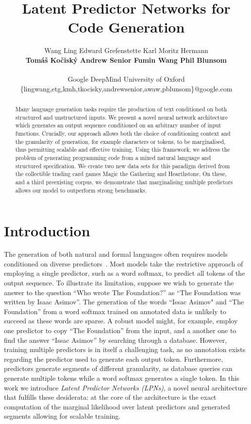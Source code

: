 \documentclass[11pt]{article}
\title{Latent Predictor Networks for Code Generation}
\author{
Wang Ling Edward Grefenstette Karl Moritz Hermann
\\
{\bf Tom\'a\v{s} Ko\v{c}isk\'y Andrew Senior Fumin Wang Phil Blunsom}
\\
\\
Google DeepMind University of Oxford
\\
\{lingwang,etg,kmh,tkocisky,andrewsenior,awaw,pblunsom\}@google.com
}\date{}
\begin{document}
\maketitle

\begin{abstract}
Many language generation tasks require the production of text
conditioned on both structured and unstructured inputs. We
present a novel neural network architecture which generates an output sequence
conditioned on an arbitrary number of input functions. Crucially, our approach
allows both the choice of conditioning context and the granularity of
generation, for example characters or tokens, to be marginalised, thus
permitting scalable and effective training.  Using this framework, we address
the problem of generating programming code from a mixed natural language and
structured specification. We create two new data sets for this paradigm derived
from the collectible trading card games Magic the Gathering and Hearthstone. On
these, and a third preexisting corpus, we demonstrate that marginalising
multiple predictors allows our model to outperform strong benchmarks.

\end{abstract}

\section{Introduction}

The generation of both natural and formal languages often requires models conditioned on diverse predictors~\cite{Koehn:2007:MOS:1557769.1557821,Wong:2006:LSP:1220835.1220891}. Most models take the restrictive approach of employing a single predictor, such as a word softmax, to predict all tokens of the output sequence. To illustrate its limitation, suppose we wish to generate the answer to the question ``Who wrote The Foundation?'' as ``The Foundation was written by Isaac Asimov''. The generation of the words ``Issac Asimov" and ``The Foundation'' from a word softmax trained on annotated data is unlikely to succeed as these words are sparse. A robust model might, for example, employ one predictor to copy ``The Foundation'' from the input, and a another one to find the answer ``Issac Asimov'' by searching through a database. However, training multiple predictors is in itself a challenging task, as no annotation exists regarding the predictor used to generate each output token. Furthermore, predictors generate segments of different granularity, as database queries can generate multiple tokens while a word softmax generates a single token. In this work we introduce \emph{Latent Predictor Networks (LPNs)}, a novel neural architecture that fulfills these desiderata: at the core of the architecture is the exact computation of the marginal likelihood over latent predictors and generated segments allowing for scalable training.
\end{document}
